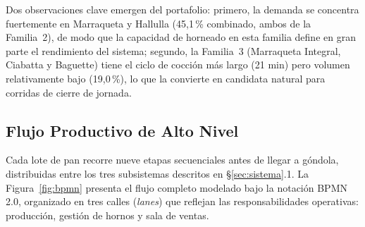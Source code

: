 \documentclass[10pt, a4paper]{article}
\begin{document}
Dos observaciones clave emergen del portafolio: primero, la demanda se concentra
fuertemente en Marraqueta y Hallulla (45{,}1\,\% combinado, ambos de la
Familia~2), de modo que la capacidad de horneado en esta familia define en gran
parte el rendimiento del sistema; segundo, la Familia~3 (Marraqueta Integral,
Ciabatta y Baguette) tiene el ciclo de cocci\'on m\'as largo (21 min) pero
volumen relativamente bajo (19{,}0\,\%), lo que la convierte en candidata
natural para corridas de cierre de jornada.

\subsection{Flujo Productivo de Alto Nivel}

Cada lote de pan recorre nueve etapas secuenciales antes de llegar a
g\'ondola, distribuidas entre los tres subsistemas descritos en
\S\ref{sec:sistema}.1. La Figura~\ref{fig:bpmn} presenta el flujo completo
modelado bajo la notaci\'on BPMN\,2.0, organizado en tres calles (\emph{lanes})
que reflejan las responsabilidades operativas: producci\'on, gesti\'on de hornos
y sala de ventas.
\end{document}
